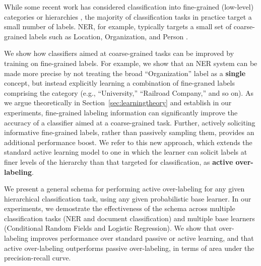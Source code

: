 \documentclass[10pt, conference, compsocconf]{IEEEtran}
\begin{document}
While some recent work has considered classification into fine-grained (low-level) 
categories \cite{fleischman2002fine,ling2012fine}
or hierarchies \cite{yosef2012hyena}, the majority of classification tasks in practice
target a small number of labels.  NER, for example, typically
targets a small set of coarse-grained labels such as Location, Organization,
and Person \cite{finkel2005incorporating}. 

We show how classifiers 
aimed at coarse-grained tasks can be improved by training on fine-grained labels.  For
example, we show that an NER system can be made more precise by not
treating the broad ``Organization'' label as a {\bf single} concept, but instead explicitly 
learning a combination of fine-graned labels comprising the category 
(e.g., ``University,'' ``Railroad Company,'' and so on).  As we argue theoretically 
in Section~\ref{sec:learningtheory} and establish in our experiments,
fine-grained labeling information can significantly improve the accuracy of a classifier aimed at a 
coarse-grained task.  Further, actively soliciting informative fine-grained labels, rather
than passively sampling them, provides an additional performance boost.  
We refer to this new approach, which extends the standard active
learning model to one in which the learner can solicit labels at finer
levels of the hierarchy than that targeted for classification,
as {\bf active over-labeling}.  


We present a general schema for performing active over-labeling
for any given hierarchical classification task, using
any given probabilistic base learner.  In our experiments, we demostrate
the effectiveness of the schema across multiple classification tasks (NER and document
classification) and multiple base learners (Conditional Random Fields and Logistic Regression).
We show that over-labeling improves performance over standard
passive or active learning, and that active over-labeling outperforms passive
over-labeling, in terms of area under the precision-recall curve.
\end{document}
